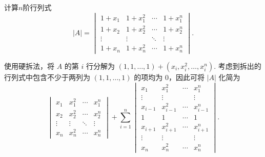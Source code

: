 \begin{exercise}
\begin{exgroup}
        \item 计算$n$阶行列式
        \[|A|=\begin{vmatrix}
                1+x_1  & 1+x_1^2 & \cdots & 1+x_1^n \\
                1+x_2  & 1+x_2^2 & \cdots & 1+x_2^n \\
                \vdots & \vdots  & \ddots & \vdots  \\
                1+x_n  & 1+x_n^2 & \cdots & 1+x_n^n
            \end{vmatrix}.\]
        \begin{answer}
            使用硬拆法，将 $A$ 的第 $i$ 行分解为 $(1, 1, \ldots, 1) + (x_i, x_i^2, \ldots, x_i^n)$. 考虑到拆出的行列式中包含不少于两列为 $(1, 1, \ldots, 1)$ 的项均为 $0$，因此可将 $|A|$ 化简为
            \[
                \begin{vmatrix}
                    x_1    & x_1^2  & \cdots & x_1^n  \\
                    x_2    & x_2^2  & \cdots & x_2^n  \\
                    \vdots & \vdots & \ddots & \vdots \\
                    x_n    & x_n^2  & \cdots & x_n^n
                \end{vmatrix} + \sum_{i=1}^n \begin{vmatrix}
                    x_1     & x_1^2     & \cdots & x_1^n     \\
                    \vdots  & \vdots    &        & \vdots    \\
                    x_{i-1} & x_{i-1}^2 & \cdots & x_{i-1}^n \\
                    1       & 1         & \cdots & 1         \\
                    x_{i+1} & x_{i+1}^2 & \cdots & x_{i+1}^n \\
                    \vdots  & \vdots    &        & \vdots    \\
                    x_n     & x_n^2     & \cdots & x_n^n
                \end{vmatrix}.
            \]


\end{answer}
\end{exgroup}
\end{exercise}
